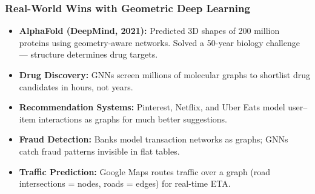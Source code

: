 \begin{frame}[fragile]\frametitle{Real-World Wins with Geometric Deep Learning}
\begin{itemize}
  \item \textbf{AlphaFold (DeepMind, 2021):} Predicted 3D shapes of 200 million proteins using geometry-aware networks. Solved a 50-year biology challenge --- structure determines drug targets.
  \vspace{0.1cm}
  \item \textbf{Drug Discovery:} GNNs screen millions of molecular graphs to shortlist drug candidates in hours, not years.
  \vspace{0.1cm}
  \item \textbf{Recommendation Systems:} Pinterest, Netflix, and Uber Eats model user--item interactions as graphs for much better suggestions.
  \vspace{0.1cm}
  \item \textbf{Fraud Detection:} Banks model transaction networks as graphs; GNNs catch fraud patterns invisible in flat tables.
  \vspace{0.1cm}
  \item \textbf{Traffic Prediction:} Google Maps routes traffic over a graph (road intersections = nodes, roads = edges) for real-time ETA.
\end{itemize}
\vspace{0.2cm}
\begin{block}{}
\end{block}
\end{frame}
